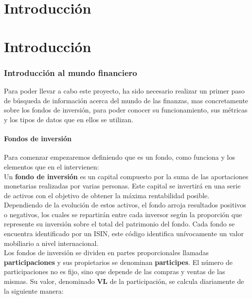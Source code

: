 \documentclass[12pt, a4paper]{article}
\newcommand*\parttitle{}
\let\origpart\part
\renewcommand*{\part}[2][]{%
	\ifx\\#1\\%
	\origpart{#2}%
	\renewcommand*\parttitle{#2}%
	\else
	\origpart[#1]{#2}%
	\renewcommand*\parttitle{#1}%
	\fi
}
\begin{document}
\newpage
\tableofcontents
\newpage

\part{Introducción}
\section{Introducción al mundo financiero}
Para poder llevar a cabo este proyecto, ha sido necesario realizar un primer paso de búsqueda de información acerca del mundo de las finanzas, mas concretamente sobre los fondos de inversión, para poder conocer su funcionamiento, sus métricas y los tipos de datos que en ellos se utilizan.\\

\subsection{Fondos de inversión}

Para comenzar empezaremos definiendo que es un fondo, como funciona y los elementos que en el intervienen:\\

Un \textbf{fondo de inversión} es un capital compuesto por la suma de las aportaciones monetarias realizadas por varias personas. Este capital se invertirá en una serie de activos con el objetivo de obtener la máxima rentabilidad posible. Dependiendo de la evolución de estos activos, el fondo arroja resultados positivos o negativos, los cuales se repartirán entre cada inversor según la proporción que represente su inversión sobre el total del patrimonio del fondo. Cada fondo se encuentra identificado por un \gls{ISIN}, este código identifica unívocamente un valor mobiliario a nivel internacional.\\

Los fondos de inversión se dividen en partes proporcionales llamadas \textbf{participaciones} y sus propietarios se denominan \textbf{participes}. El número de participaciones no es fijo, sino que depende de las compras y ventas de las mismas. Su valor, denominado \textbf{\gls{VL}} de la participación, se calcula diariamente de la siguiente manera: 
	
\end{document}
